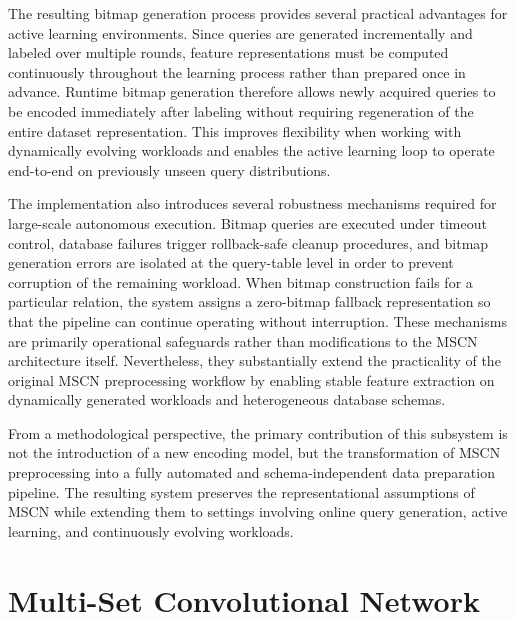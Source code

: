 The resulting bitmap generation process provides several practical advantages for active learning environments. Since queries are generated incrementally and labeled over multiple rounds, feature representations must be computed continuously throughout the learning process rather than prepared once in advance. Runtime bitmap generation therefore allows newly acquired queries to be encoded immediately after labeling without requiring regeneration of the entire dataset representation. This improves flexibility when working with dynamically evolving workloads and enables the active learning loop to operate end-to-end on previously unseen query distributions.

The implementation also introduces several robustness mechanisms required for large-scale autonomous execution. Bitmap queries are executed under timeout control, database failures trigger rollback-safe cleanup procedures, and bitmap generation errors are isolated at the query-table level in order to prevent corruption of the remaining workload. When bitmap construction fails for a particular relation, the system assigns a zero-bitmap fallback representation so that the pipeline can continue operating without interruption. These mechanisms are primarily operational safeguards rather than modifications to the MSCN architecture itself. Nevertheless, they substantially extend the practicality of the original MSCN preprocessing workflow by enabling stable feature extraction on dynamically generated workloads and heterogeneous database schemas.

From a methodological perspective, the primary contribution of this subsystem is not the introduction of a new encoding model, but the transformation of MSCN preprocessing into a fully automated and schema-independent data preparation pipeline. The resulting system preserves the representational assumptions of MSCN while extending them to settings involving online query generation, active learning, and continuously evolving workloads.

\section{Multi-Set Convolutional Network}

